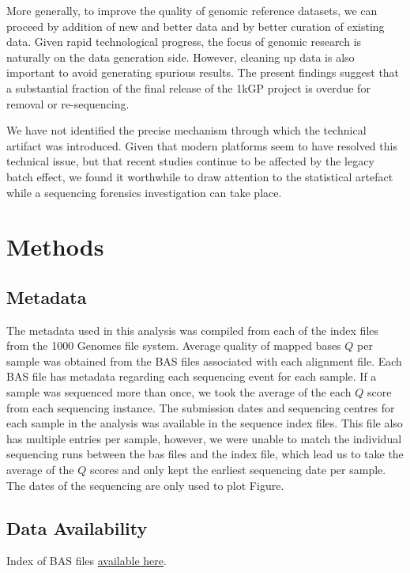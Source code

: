 \documentclass[9pt,lineno]{elife}
\begin{document}
More generally, to improve the quality of genomic reference datasets, we can proceed by addition of new and better data and by better curation of existing data.
Given rapid technological progress, the focus of genomic research is naturally on the data generation side. 
However, cleaning up data is also important to avoid generating spurious results. 
The present findings suggest that a substantial fraction of the final release of the 1kGP project is overdue for removal or re-sequencing.

We have not identified the precise mechanism through which the technical artifact was introduced. Given that modern platforms seem to have resolved this technical issue, but that recent studies continue to be affected by the legacy batch effect, we found it worthwhile to draw attention to the statistical artefact while a sequencing forensics investigation can take place. 


\section{Methods}
\subsection{Metadata}
The metadata used in this analysis was compiled from each of the index files from the 1000 Genomes file system. 
Average quality of mapped bases $Q$ per sample was obtained from the BAS files associated with each alignment file. 
Each BAS file has metadata regarding each sequencing event for each sample. 
If a sample was sequenced more than once, we took the average of the each $Q$ score from each sequencing instance. 
The submission dates and sequencing centres for each sample in the analysis was available in the sequence index files.  
This file also has multiple entries per sample, however, we were unable to match the individual sequencing runs between the bas files and the index file, which lead us to take the average of the $Q$ scores and only kept the earliest sequencing date per sample. 
The dates of the sequencing are only used to plot Figure.

\subsection{Data Availability}

Index of BAS files \href{http://ftp.1000genomes.ebi.ac.uk/vol1/ftp/data_collections/1000_genomes_project/1000genomes.low_coverage.GRCh38DH.alignment.index}{available here}.
\end{document}
